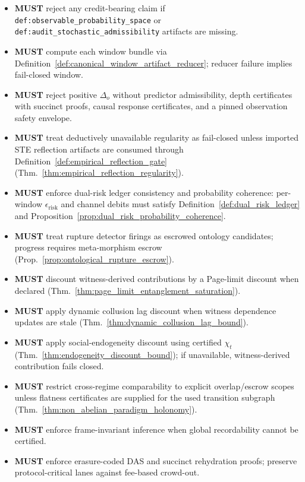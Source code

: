 \documentclass[11pt]{article}
\theoremstyle{definition}
\theoremstyle{plain}
\newcommand{\MUST}{\textbf{MUST}}
\newcommand{\STE}{\textsf{STE}}
\newcommand{\lbl}[1]{\texttt{\footnotesize\nolinkurl{#1}}}
\newcommand{\deltao}{\Delta_o}
\begin{document}
\begin{itemize}[leftmargin=*]
  \item \MUST{} reject any credit-bearing claim if \lbl{def:observable_probability_space} or \lbl{def:audit_stochastic_admissibility} artifacts are missing.
  \item \MUST{} compute each window bundle via Definition~\ref{def:canonical_window_artifact_reducer}; reducer failure implies fail-closed window.
  \item \MUST{} reject positive $\deltao$ without predictor admissibility, depth certificates with succinct proofs, causal response certificates, and a pinned observation safety envelope.
  \item \MUST{} treat deductively unavailable regularity as fail-closed unless imported \STE{} reflection artifacts are consumed through Definition~\ref{def:empirical_reflection_gate} (Thm.~\ref{thm:empirical_reflection_regularity}).
  \item \MUST{} enforce dual-risk ledger consistency and probability coherence: per-window $\epsilon_{\mathrm{risk}}$ and channel debits must satisfy Definition~\ref{def:dual_risk_ledger} and Proposition~\ref{prop:dual_risk_probability_coherence}.
  \item \MUST{} treat rupture detector firings as escrowed ontology candidates; progress requires meta-morphism escrow (Prop.~\ref{prop:ontological_rupture_escrow}).
  \item \MUST{} discount witness-derived contributions by a Page-limit discount when declared (Thm.~\ref{thm:page_limit_entanglement_saturation}).
  \item \MUST{} apply dynamic collusion lag discount when witness dependence updates are stale (Thm.~\ref{thm:dynamic_collusion_lag_bound}).
  \item \MUST{} apply social-endogeneity discount using certified $\chi_t$ (Thm.~\ref{thm:endogeneity_discount_bound}); if unavailable, witness-derived contribution fails closed.
  \item \MUST{} restrict cross-regime comparability to explicit overlap/escrow scopes unless flatness certificates are supplied for the used transition subgraph (Thm.~\ref{thm:non_abelian_paradigm_holonomy}).
  \item \MUST{} enforce frame-invariant inference when global recordability cannot be certified.
  \item \MUST{} enforce erasure-coded DAS and succinct rehydration proofs; preserve protocol-critical lanes against fee-based crowd-out.

\end{itemize}
\end{document}
